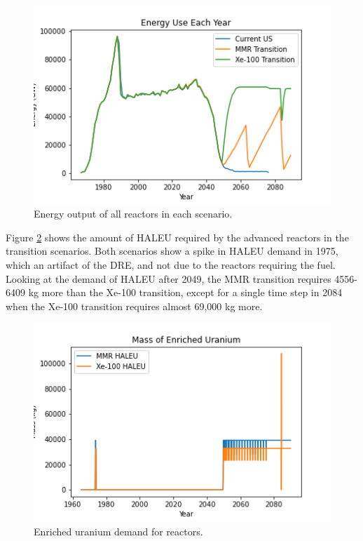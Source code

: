 \begin{figure}[ht]
    \centering
    \includegraphics[scale=0.5]{figures/energy_all.png}
    \caption{Energy output of all reactors in each scenario.}
    \label{fig:energy}
\end{figure}

Figure \ref{fig:enriched_u} shows the amount of \gls{HALEU} 
required by the advanced reactors in the transition scenarios. 
Both scenarios show a spike in \gls{HALEU} demand in 1975, which 
an artifact of the DRE, and not due to the reactors requiring the 
fuel. Looking at the demand of \gls{HALEU} after 2049, the 
\gls{MMR} transition requires 4556-6409 kg more than the 
Xe-100 transition, except for a single time step in 2084 when 
the Xe-100 transition requires almost 69,000 kg more. 

\begin{figure}[ht]
    \centering
    \includegraphics[scale=0.5]{figures/enrichedU_advancedrx.png}
    \caption{Enriched uranium demand for reactors.}
    \label{fig:enriched_u}
\end{figure}

